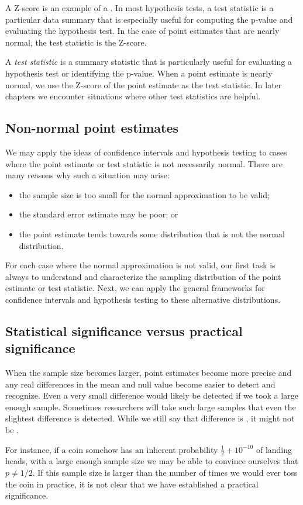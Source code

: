 A Z-score is an example of a . In most hypothesis tests, a test statistic is a particular data summary that is especially useful for computing the p-value and evaluating the hypothesis test. In the case of point estimates that are nearly normal, the test statistic is the Z-score.

\begin{termBox}{
A \emph{test statistic} is a summary statistic that is particularly useful for evaluating a hypothesis test or identifying the p-value. When a point estimate is nearly normal, we use the Z-score of the point estimate as the test statistic. In later chapters we encounter situations where other test statistics are helpful.}
\end{termBox}


\subsection{Non-normal point estimates}

	We may apply the ideas of confidence intervals and hypothesis testing to cases where the point estimate or test statistic is not necessarily normal.
	There are many reasons why such a situation may arise:
	\begin{itemize}
		\setlength{\itemsep}{0mm}
		\item the sample size is too small for the normal approximation to be valid;
		\item the standard error estimate may be poor; or
		\item the point estimate tends towards some distribution that is not the normal distribution.
	\end{itemize}
	For each case where the normal approximation is not valid, our first task is always to understand and characterize the sampling distribution of the point estimate or test statistic. Next, we can apply the general frameworks for confidence intervals and hypothesis testing to these alternative distributions.


\subsection{Statistical significance versus practical significance}

	When the sample size becomes larger, point estimates become more precise and
	any real differences in the mean and null value become easier to detect and recognize.
	Even a very small difference would likely be detected if we took a large enough sample.
	Sometimes researchers will take such large samples that even the slightest difference is detected.
	While we still say that difference is , it might not be .

	For instance, if a coin somehow has an inherent probability $\frac12+10^{-10}$ of landing heads,
	with a large enough sample size we may be able to convince ourselves that $p\ne 1/2$.
	If this sample size is larger than the number of times we would ever toss the coin in practice,
	it is not clear that we have established a practical significance.
